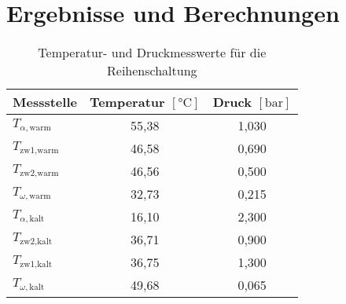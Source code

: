 \section{Ergebnisse und Berechnungen}
\label{sec:ergebnisse}


\begin{table}[h!]
		\centering
	\caption{Temperatur- und Druckmesswerte für die Reihenschaltung}
	\begin{tabulary}{\textwidth}{L|C|C}
		\textbf{Messstelle} & \textbf{Temperatur} $\left[\si{\celsius}\right]$& \textbf{Druck} $\left[\si{\bar}\right]$\\
		\hline
		$T_{\alpha,\text{warm}}$ & 55,38 & 1,030\\
		$T_{\text{zw1},\text{warm}}$  & 46,58 & 0,690  \\
		$T_{\text{zw2},\text{warm}}$  & 46,56 & 0,500\\
		$T_{\omega,\text{warm}}$  & 32,73 & 0,215 \\
		\hline
		$T_{\alpha,\text{kalt}}$  & 16,10 & 2,300\\
		$T_{\text{zw2},\text{kalt}}$   & 36,71 & 0,900  \\
		$T_{\text{zw1},\text{kalt}}$   & 36,75 & 1,300   \\
		$T_{\omega,\text{kalt}}$ & 49,68 & 0,065 \\
	\end{tabulary}%
	\label{tab:messung_reihe}%
\end{table}%
\FloatBarrier
\,

\begin{table}[h!]
	\renewcommand*{\arraystretch}{1.2}
	\centering
	\caption{Strömungsrelevante Größen der Reihenschaltung}
	\label{tab:strom_reihe}
\end{table}%
\FloatBarrier

